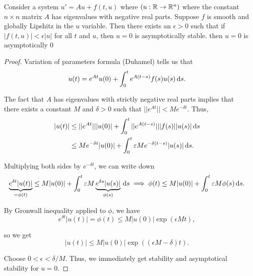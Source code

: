 \documentclass{article}
\begin{document}
    \begin{theorem}[Claim.]{}
        Consider a system $u' = Au + f(t, u)$ where $(u : \mathbb{R} \to \mathbb{R}^n)$ where the constant $n \times n$ matrix $A$ has eigenvalues with negative real parts. Suppose $f$ is smooth and globally Lipshitz in the $u$ variable. Then there exists an $\epsilon > 0$ such that if $|f(t, u)| < \epsilon |u|$ for all $t$ and $u$, then $u = 0$ is asymptotically stable. then $u = 0$ is asymptotically $0$ 
    \end{theorem}
    \begin{proof}
        Variation of parameters formula (Duhamel) tells us that 
        \[
            u(t) = e^{At}u(0) + \int_0^t e^{A(t - s)} f(s) u(s) \, \text{d}s.
        \]  

        The fact that $A$ has eigenvalues with strictly negative real parts implies that there exists a constant $M$ and $\delta > 0$ such that $||e^{At}|| < Me^{-\delta t}$. Thus, 
        \begin{align*}
            |u(t)| &\leq  ||e^{At}|| |u(0)| + \int_0^t ||e^{A(t - s)}|| |f(s)| |u(s)| \, \text{d}s \\
            &\leq Me^{-\delta t} |u(0)| + \int_0^t \varepsilon M e^{-\delta (t - s)} |u(s) | \, \text{d} s.
        \end{align*}

        Multiplying both sides by $e^{-\delta t}$, we can write down 
        \[
            \underbrace{e^{\delta t}|u(t)|}_{=\phi(t)} \leq M|u(0)| + \int_0^t \varepsilon M \underbrace{e^{\delta s} |u(s)|}_{\phi(s)} \, \text{d} s \implies \phi(t) \leq M|u(0)| + \int_0^t \varepsilon M \phi(s) \, \text{d}s. 
        \]

        By Gronwall inequality applied to $\phi$, we have 
        \[
            e^{\delta t} |u(t)| = \phi(t) \leq M |u(0)| \exp(\epsilon M t),
        \]

        so we get 
        \[
            |u(t)| \leq M|u(0)| \exp ((\epsilon M - \delta) t).
        \]

        Choose $0 < \epsilon < \delta / M$. Thus, we immediately get stability and asymptotical stability for $u = 0$. 
    \end{proof}
\end{document}
